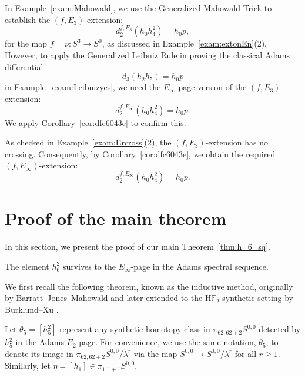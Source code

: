 \documentclass{amsart}
\numberwithin{equation}{section}
\begin{document}
\begin{example} \label{exam:stretchext}
    In Example~\ref{exam:Mahowald}, we use the Generalized Mahowald Trick to establish the $(f, E_3)$-extension:
        $$d_2^{f, E_3} (h_0h_4^2) = h_0 p,$$
        for the map $f=\nu:S^3 \rightarrow S^0$, as discussed
in Example~\ref{exam:extonEn}(2). However, to apply the Generalized Leibniz Rule in proving the classical Adams differential 
$$d_3(h_2h_5) = h_0p$$
in Example~\ref{exam:Leibnizyes}, we need the $E_\infty$-page version of the $(f, E_3)$-extension:
$$d_2^{f, E_\infty} (h_0h_4^2) = h_0 p.$$
We apply Corollary~\ref{cor:dfc6043e} to confirm this.

As checked in Example~\ref{exam:Ercross}(2), the $(f, E_3)$-extension has no crossing. Consequently, by Corollary~\ref{cor:dfc6043e}, we obtain the required $(f, E_\infty)$-extension:
$$d_2^{f, E_\infty} (h_0h_4^2) = h_0 p.$$
\end{example}


\section{Proof of the main theorem}

In this section, we present the proof of our main Theorem~\ref{thm:h_6_sq}. 

\begin{theorem} \label{thm:126survives}
    The element $h_6^2$ survives to the $E_\infty$-page in the Adams spectral sequence.
\end{theorem}

We first recall the following theorem, known as the inductive method, originally by Barratt--Jones--Mahowald \cite{BJMinduction} and later extended to the H$\mathbb{F}_2$-synthetic setting by Burklund--Xu \cite[Proposition~7.19]{BurklundXu}.

\begin{notation}
    Let $\theta_5 = [h_5^2]$ represent any synthetic homotopy class in $\pi_{62,62+2}S^{0,0}$ detected by $h_5^2$ in the Adams $E_2$-page. For convenience, we use the same notation, $\theta_5$, to denote its image in $\pi_{62,62+2}S^{0,0}/\lambda^r$ via the map $S^{0,0} \rightarrow S^{0,0}/\lambda^r$ for all $r \ge 1$. Similarly, let $\eta = [h_1] \in \pi_{1,1+1}S^{0,0}$.
\end{notation}
\end{document}
